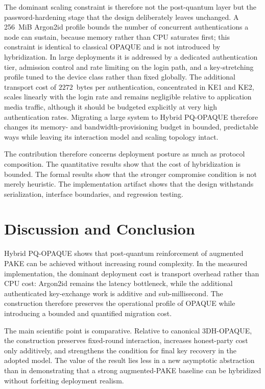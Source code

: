 \documentclass[conference]{IEEEtran}
\begin{document}
The dominant scaling constraint is therefore not the post-quantum layer but the password-hardening stage that the design deliberately leaves unchanged. A 256~MiB Argon2id profile bounds the number of concurrent authentications a node can sustain, because memory rather than CPU saturates first; this constraint is identical to classical OPAQUE and is not introduced by hybridization. In large deployments it is addressed by a dedicated authentication tier, admission control and rate limiting on the login path, and a key-stretching profile tuned to the device class rather than fixed globally. The additional transport cost of $2272$~bytes per authentication, concentrated in KE1 and KE2, scales linearly with the login rate and remains negligible relative to application media traffic, although it should be budgeted explicitly at very high authentication rates. Migrating a large system to Hybrid PQ-OPAQUE therefore changes its memory- and bandwidth-provisioning budget in bounded, predictable ways while leaving its interaction model and scaling topology intact.

The contribution therefore concerns deployment posture as much as protocol composition. The quantitative results show that the cost of hybridization is bounded. The formal results show that the stronger compromise condition is not merely heuristic. The implementation artifact shows that the design withstands serialization, interface boundaries, and regression testing.

\section{Discussion and Conclusion}

Hybrid PQ-OPAQUE shows that post-quantum reinforcement of augmented PAKE can be achieved without increasing round complexity. In the measured implementation, the dominant deployment cost is transport overhead rather than CPU cost: Argon2id remains the latency bottleneck, while the additional authenticated key-exchange work is additive and sub-millisecond. The construction therefore preserves the operational profile of OPAQUE while introducing a bounded and quantified migration cost.

The main scientific point is comparative. Relative to canonical 3DH-OPAQUE, the construction preserves fixed-round interaction, increases honest-party cost only additively, and strengthens the condition for final key recovery in the adopted model. The value of the result lies less in a new asymptotic abstraction than in demonstrating that a strong augmented-PAKE baseline can be hybridized without forfeiting deployment realism.
\end{document}

